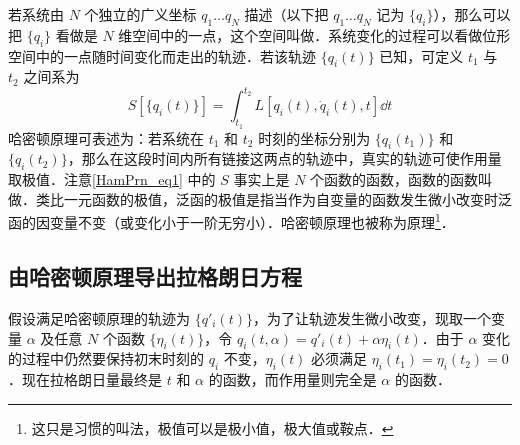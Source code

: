 

若系统由 $N$ 个独立的广义坐标 $q_1\dots q_N$ 描述（以下把 $q_1\dots q_N$ 记为 $\{q_i\}$），那么可以把 $\{q_i\}$ 看做是 $N$ 维空间中的一点，这个空间叫做．系统变化的过程可以看做位形空间中的一点随时间变化而走出的轨迹．若该轨迹 $\{ {{q_i}(t)} \}$ 已知，可定义 $t_1$ 与 $t_2$ 之间系为
\begin{equation}\label{HamPrn_eq1}
S[\{q_i(t)\}] = \int_{t_1}^{t_2} L[q_i(t), \dot q_i(t), t] \dd{t}
\end{equation}
哈密顿原理可表述为：若系统在 $t_1$ 和 $t_2$ 时刻的坐标分别为 $\{q_i(t_1)\}$ 和 $\{q_i(t_2)\}$，那么在这段时间内所有链接这两点的轨迹中，真实的轨迹可使作用量取极值．注意\autoref{HamPrn_eq1} 中的 $S$ 事实上是 $N$ 个函数的函数，函数的函数叫做．类比一元函数的极值，泛函的极值是指当作为自变量的函数发生微小改变时泛函的因变量不变（或变化小于一阶无穷小）．哈密顿原理也被称为原理\footnote{这只是习惯的叫法，极值可以是极小值，极大值或鞍点．}．%

\subsection{由哈密顿原理导出拉格朗日方程}

假设满足哈密顿原理的轨迹为 $\{q'_i(t)\}$，为了让轨迹发生微小改变，现取一个变量 $\alpha$ 及任意 $N$ 个函数 $\{\eta_i(t)\}$，令 $q_i(t,\alpha ) = q'_i(t) + \alpha \eta_i(t)$．由于 $\alpha$ 变化的过程中仍然要保持初末时刻的 $q_i$ 不变，$\eta_i(t)$ 必须满足 $\eta_i(t_1) = \eta_i(t_2) = 0$．现在拉格朗日量最终是 $t$ 和 $\alpha$ 的函数，而作用量则完全是 $\alpha$ 的函数．
 
